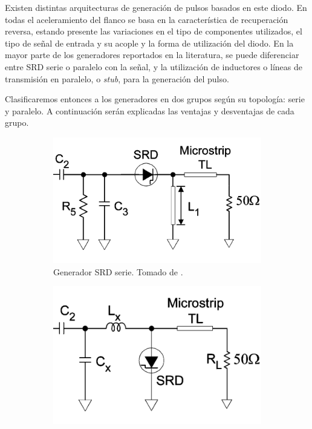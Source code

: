 Existen distintas arquitecturas de generación de pulsos basados en este diodo.
En todas el aceleramiento del flanco se basa en la característica de
recuperación reversa, estando presente las variaciones en el tipo de componentes
utilizados, el tipo de señal de entrada y su acople y la forma de utilización
del diodo. En la mayor parte de los generadores reportados en la literatura, se
puede diferenciar entre SRD serie o paralelo con la señal, y la utilización de
inductores o líneas de transmisión en paralelo, o \textit{stub}, para la
generación del pulso.

Clasificaremos entonces a los generadores en dos grupos según su topología:
serie y paralelo. A continuación serán explicadas las ventajas y desventajas de
cada grupo.

\begin{figure}
    \centering
    \begin{subfigure}[b]{0.45\textwidth}
        \centering
        \includegraphics[width=\textwidth]{images/srd_series_generator.png}
        \caption{Generador SRD serie. Tomado de \cite{han2005}.}
        \label{fig:srd_series_generator}
    \end{subfigure}
    \hfill
    \begin{subfigure}[b]{0.45\textwidth}
        \centering
        \includegraphics[width=\textwidth]{images/srd_shunt_generator.png}

\end{subfigure}
\end{figure}
